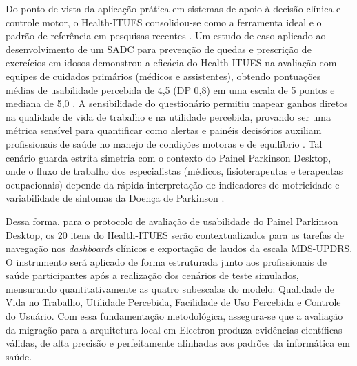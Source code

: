 Do ponto de vista da aplicação prática em sistemas de apoio à decisão clínica e controle motor, o Health-ITUES consolidou-se como a ferramenta ideal e o padrão de referência em pesquisas recentes \cite{Tejeda2024}. Um estudo de caso aplicado ao desenvolvimento de um SADC para prevenção de quedas e prescrição de exercícios em idosos demonstrou a eficácia do Health-ITUES na avaliação com equipes de cuidados primários (médicos e assistentes), obtendo pontuações médias de usabilidade percebida de 4,5 (DP 0,8) em uma escala de 5 pontos e mediana de 5,0 \cite{Tejeda2024}. A sensibilidade do questionário permitiu mapear ganhos diretos na qualidade de vida de trabalho e na utilidade percebida, provando ser uma métrica sensível para quantificar como alertas e painéis decisórios auxiliam profissionais de saúde no manejo de condições motoras e de equilíbrio \cite{Tejeda2024}. Tal cenário guarda estrita simetria com o contexto do Painel Parkinson Desktop, onde o fluxo de trabalho dos especialistas (médicos, fisioterapeutas e terapeutas ocupacionais) depende da rápida interpretação de indicadores de motricidade e variabilidade de sintomas da Doença de Parkinson \cite{Tejeda2024}.

Dessa forma, para o protocolo de avaliação de usabilidade do Painel Parkinson Desktop, os 20 itens do Health-ITUES serão contextualizados para as tarefas de navegação nos \textit{dashboards} clínicos e exportação de laudos da escala MDS-UPDRS. O instrumento será aplicado de forma estruturada junto aos profissionais de saúde participantes após a realização dos cenários de teste simulados, mensurando quantitativamente as quatro subescalas do modelo: Qualidade de Vida no Trabalho, Utilidade Percebida, Facilidade de Uso Percebida e Controle do Usuário. Com essa fundamentação metodológica, assegura-se que a avaliação da migração para a arquitetura local em Electron produza evidências científicas válidas, de alta precisão e perfeitamente alinhadas aos padrões da informática em saúde.

